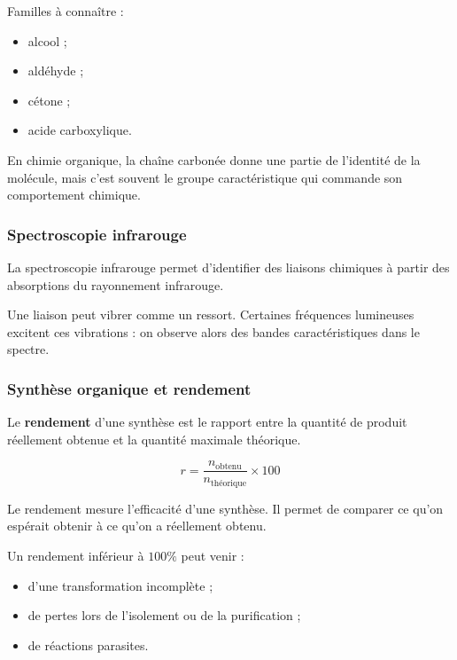 \documentclass[11pt,a4paper]{article}
\begin{document}
Familles à connaître :
\begin{itemize}
    \item alcool ;
    \item aldéhyde ;
    \item cétone ;
    \item acide carboxylique.
\end{itemize}

\begin{sensbox}
En chimie organique, la chaîne carbonée donne une partie de l'identité de la molécule, mais c'est souvent le groupe caractéristique qui commande son comportement chimique.
\end{sensbox}

\subsubsection{Spectroscopie infrarouge}

\begin{definitionbox}
La spectroscopie infrarouge permet d'identifier des liaisons chimiques à partir des absorptions du rayonnement infrarouge.
\end{definitionbox}

\begin{sensbox}
Une liaison peut vibrer comme un ressort.  
Certaines fréquences lumineuses excitent ces vibrations : on observe alors des bandes caractéristiques dans le spectre.
\end{sensbox}

\subsubsection{Synthèse organique et rendement}

\begin{definitionbox}
Le \textbf{rendement} d'une synthèse est le rapport entre la quantité de produit réellement obtenue et la quantité maximale théorique.
\end{definitionbox}

\[
r=\frac{n_{\text{obtenu}}}{n_{\text{théorique}}}\times 100
\]

\begin{sensbox}
Le rendement mesure l'efficacité d'une synthèse.  
Il permet de comparer ce qu'on espérait obtenir à ce qu'on a réellement obtenu.
\end{sensbox}

\begin{attentionbox}
Un rendement inférieur à \(100\%\) peut venir :
\begin{itemize}
    \item d'une transformation incomplète ;
    \item de pertes lors de l'isolement ou de la purification ;
    \item de réactions parasites.
\end{itemize}
\end{attentionbox}
\end{document}
